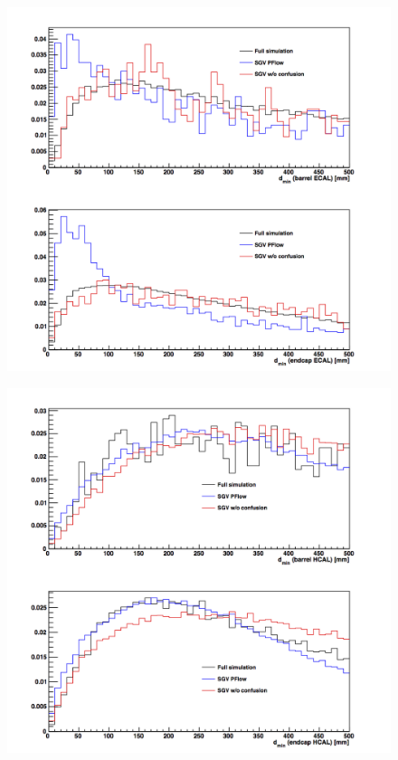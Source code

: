\documentclass[a4paper,12pt]{article}
\begin{document}
\noindent
\begin{minipage}{\linewidth}
\centering
\begin{minipage}{0.4\linewidth}
\begin{figure}[H]
    \includegraphics[width=\linewidth]{dmin_charged_to_neutral_ECAL_all.png}
\end{figure}
\end{minipage}
      \hspace{0.05\linewidth}
      \begin{minipage}{0.4\linewidth}
\begin{figure}[H]
    \includegraphics[width=\linewidth]{dmin_charged_to_neutral_HCAL_all.png} 
\end{figure}
\end{minipage}
   \label{fig:dmin}
\end{minipage}\\[0.5cm]
\end{document}
